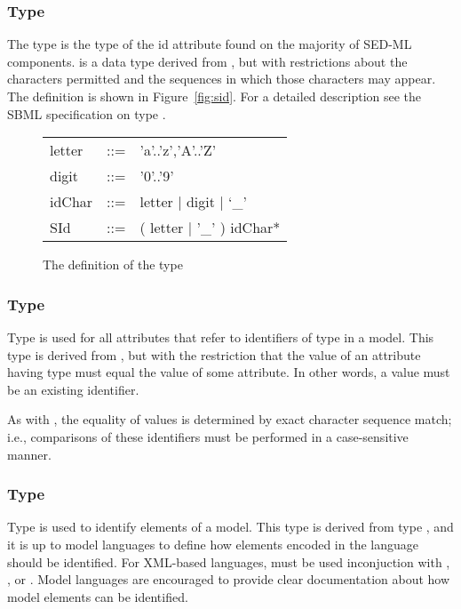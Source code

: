 \subsubsection[\element{SId}]{Type }
\label{type:sid}
The type  is the type of the id attribute found on the majority of SED-ML components.  is a data type derived from , but with restrictions about the characters permitted and the sequences in which those characters may appear. The definition is shown in Figure~\vref{fig:sid}. For a detailed description see the SBML specification on type  \citep{HBH+10}.

\begin{figure}[hbt]
  \ttfamily
  \small
  \centering
  \begin{tabular}{lll}
    letter & ::= & 'a'..'z','A'..'Z'\\
    digit  & ::= & '0'..'9'\\
    idChar & ::= & letter | digit | `\_'\\
    SId    & ::= & ( letter | '\_' ) idChar*\\
  \end{tabular}
  \vspace*{-1ex}
  \caption{The definition of the type }
  \label{fig:sid}
\end{figure}

\subsubsection[\SIdRef]{Type \SIdRef}
\label{type:sidref}
Type  is used for all attributes that refer to identifiers of type \SId in a model. This type is derived from \SId, but with the restriction that the value of an attribute having type  must equal the value of some \SId attribute. In other words, a  value must be an existing identifier.

As with \SId, the equality of  values is determined by exact character sequence match; i.e., comparisons of these identifiers must be performed in a case-sensitive manner.

\begin{blockChanged}
\subsubsection[\element{TargetType}]{Type }
\label{type:target}
Type  is used to identify elements of a model.  This type is derived from type , and it is up to model languages to define how elements encoded in the language should be identified.  For XML-based languages,  must be used inconjuction with \ChangeXML, \AddXML, or \RemoveXML. Model languages are encouraged to provide clear documentation about how model elements can be identified.
\end{blockChanged}

